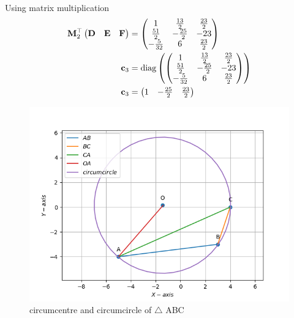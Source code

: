 \documentclass[10pt]{book}
\begin{document}
\begin{enumerate}[label=\thesubsection.\arabic*.,ref=\thesubsection.\theenumi]
\begin{align}
\end{align}
Using matrix multiplication
\begin{align}
 \mathbf{M}_2^{\top}\begin{pmatrix}\mathbf{D} & \mathbf{E} &\mathbf{F}\end{pmatrix} &=\begin{pmatrix} 1 & \frac{13}{2} & \frac{23}{2} \\ \frac{51}{2} & -\frac{25}{2} & -23 \\ -\frac{5}{32} & 6 & \frac{23}{2} \end{pmatrix} \\
    \mathbf{c}_3 &= \text{diag}\left( \begin{pmatrix} 1 & \frac{13}{2} & \frac{23}{2} \\ \frac{51}{2} & -\frac{25}{2} & -23 \\ -\frac{5}{32} & 6 & \frac{23}{2} \end{pmatrix} \right) \\
 \mathbf{c}_3   &= \begin{pmatrix} 1 & -\frac{25}{2} & \frac{23}{2}\end{pmatrix}
\end{align}
\begin{figure}[H]
    \centering
     \includegraphics{figs/circumradius_o.png}
    \caption{circumcentre and circumcircle of $\triangle$ ABC}
    \label{fig:circumradius_o}
\end{figure}
\end{enumerate}
\end{document}
